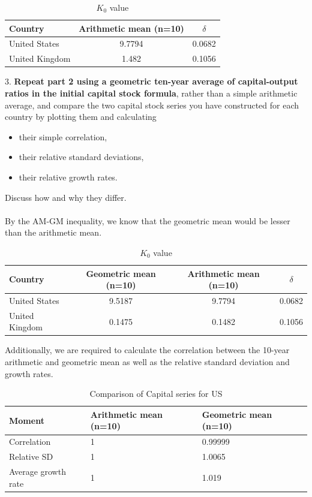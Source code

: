 \documentclass[12pt]{article}
\theoremstyle{mytheoremstyle}
\theoremstyle{mytheoremstyle}
\theoremstyle{myproblemstyle}
\begin{document}
\begin{table}[h]
    \centering
    \caption{$K_0$ value }
    \label{tab:table-1}
    \begin{tabular}{@{}lcc@{}}
    \toprule
    Country & Arithmetic mean (n=10) & $\delta$ \\ \midrule
    United States & 9.7794 & 0.0682 \\
    United Kingdom & 1.482 & 0.1056 \\ \bottomrule
    \end{tabular}
    \end{table}

3. \textbf{Repeat part 2 using a geometric ten-year average of capital-output ratios in the initial capital stock formula}, rather than a simple arithmetic average, and compare the two capital stock series you have constructed for each country by plotting them and calculating
\begin{itemize}
    \item their simple correlation,
    \item their relative standard deviations,
    \item their relative growth rates.
\end{itemize}

Discuss how and why they differ.
\\ \\
By the AM-GM inequality, we know that the geometric mean would be lesser than the arithmetic mean.

\begin{table}[htbp]
    \centering
    \caption{$K_0$ value }
    \label{tab:table-1}
    \begin{tabular}{@{}lccc@{}}
    \toprule
    Country & Geometric mean (n=10) & Arithmetic mean (n=10) & $\delta$ \\ \midrule
    United States & 9.5187 & 9.7794 & 0.0682 \\
    United Kingdom & 0.1475 & 0.1482 & 0.1056 \\ \bottomrule
    \end{tabular}
    \end{table}

Additionally, we are required to calculate the correlation between the 10-year arithmetic and geometric mean as well as the relative standard deviation and growth rates. 

\begin{table}[htbp]
    \centering
    \caption{Comparison of Capital series for US}
    \label{tab:US_K}
    \begin{tabular}{@{}lll@{}}
    \toprule
    Moment & Arithmetic mean (n=10) & Geometric mean (n=10) \\ \midrule
    Correlation & 1 & 0.99999 \\
    Relative SD & 1 & 1.0065 \\
    Average growth rate & 1 & 1.019 \\ \bottomrule
    \end{tabular}
    \end{table}
\end{document}
